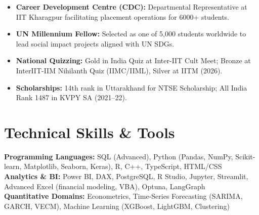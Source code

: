 \documentclass[10pt, a4paper]{article}
\begin{document}
\begin{itemize}[leftmargin=1.2em, itemsep=0.5pt, parsep=0pt, topsep=1pt]
  \small
  \item \textbf{Career Development Centre (CDC):} Departmental Representative at IIT Kharagpur facilitating placement operations for 6000+ students.
  \item \textbf{UN Millennium Fellow:} Selected as one of 5,000 students worldwide to lead social impact projects aligned with UN SDGs.
  \item \textbf{National Quizzing:} Gold in India Quiz at Inter-IIT Cult Meet; Bronze at InterIIT-IIM Nihilanth Quiz (IIMC/IIML), Silver at IITM (2026).
  \item \textbf{Scholarships:} 14th rank in Uttarakhand for NTSE Scholarship; All India Rank 1487 in KVPY SA (2021--22).
\end{itemize}

\vspace{-2pt}

\section{Technical Skills \& Tools}

\noindent
\textbf{Programming Languages:} SQL (Advanced), Python (Pandas, NumPy, Scikit-learn, Matplotlib, Seaborn, Keras), R, C++, TypeScript, HTML/CSS \\[2pt]
\textbf{Analytics \& BI:} Power BI, DAX, PostgreSQL, R Studio, Jupyter, Streamlit, Advanced Excel (financial modeling, VBA), Optuna, LangGraph \\[2pt]
\textbf{Quantitative Domains:} Econometrics, Time-Series Forecasting (SARIMA, GARCH, VECM), Machine Learning (XGBoost, LightGBM, Clustering)
\end{document}
